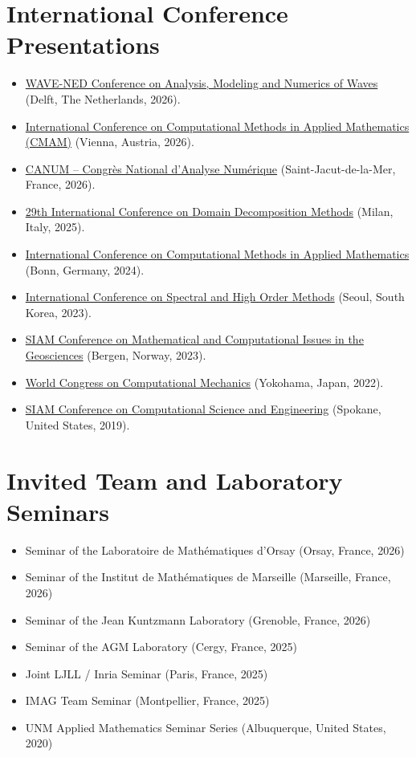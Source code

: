 \documentclass[11pt,a4paper,sans]{moderncv}
\begin{document}
\section{International Conference Presentations}
\begin{itemize}
  \item \href{https://sites.cwi.nl/en/scs/events/wave-ned-conference-on-analysis-modeling-and-numerics-of-waves/}{WAVE-NED Conference on Analysis, Modeling and Numerics of Waves} (Delft, The Netherlands, 2026).
  \item \href{https://www.tuwien.at/en/mg/asc/event/cmam2026}{International Conference on Computational Methods in Applied Mathematics (CMAM)} (Vienna, Austria, 2026).
  \item \href{https://canum2026.math.cnrs.fr/en/}{CANUM -- Congr\`es National d'Analyse Num\'erique} (Saint-Jacut-de-la-Mer, France, 2026).
  \item \href{https://www.dd29.polimi.it/}{29th International Conference on Domain Decomposition Methods} (Milan, Italy, 2025).
  \item \href{https://ins.uni-bonn.de/group/gedicke/page/cmam-10}{International Conference on Computational Methods in Applied Mathematics} (Bonn, Germany, 2024).
  \item \href{https://icosahom2023.org/}{International Conference on Spectral and High Order Methods} (Seoul, South Korea, 2023).
  \item \href{https://www.siam.org/conferences-events/past-event-archive/gs23/}{SIAM Conference on Mathematical and Computational Issues in the Geosciences} (Bergen, Norway, 2023).
  \item \href{https://www.wccm2022.org/}{World Congress on Computational Mechanics} (Yokohama, Japan, 2022).
  \item \href{https://www.siam.org/conferences-events/past-event-archive/cse19/}{SIAM Conference on Computational Science and Engineering} (Spokane, United States, 2019).
\end{itemize}


\section{Invited Team and Laboratory Seminars}
\begin{itemize}
  \item Seminar of the Laboratoire de Mathématiques d’Orsay (Orsay, France, 2026)
  \item Seminar of the  Institut de Mathématiques de Marseille (Marseille, France, 2026)
  \item Seminar of the Jean Kuntzmann Laboratory (Grenoble, France, 2026)
  \item Seminar of the AGM Laboratory (Cergy, France, 2025)
  \item Joint LJLL / Inria Seminar (Paris, France, 2025)
  \item IMAG Team Seminar (Montpellier, France, 2025)
  \item UNM Applied Mathematics Seminar Series (Albuquerque, United States, 2020)
\end{itemize}
\end{document}
